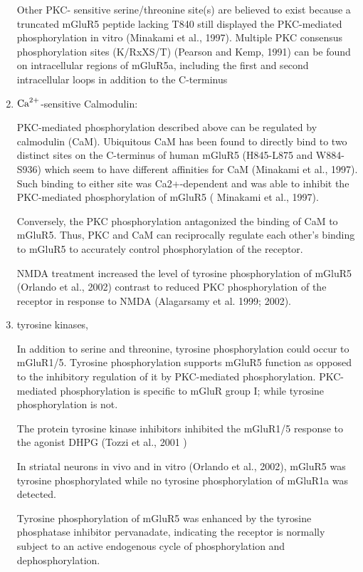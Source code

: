 \begin{enumerate}
Other PKC- sensitive serine/threonine site(s) are believed to exist
because a truncated mGluR5 peptide lacking T840 still displayed the PKC-mediated
phosphorylation in vitro (Minakami et al., 1997).
Multiple PKC consensus phosphorylation sites (K/RxXS/T) (Pearson and
Kemp, 1991) can be found on intracellular regions of mGluR5a, including the first and second
intracellular loops in addition to the C-terminus

  \item ${\text{Ca}^{2+}}$-sensitive Calmodulin:
  
PKC-mediated phosphorylation described above can be regulated by calmodulin
(CaM). Ubiquitous CaM has been found to directly bind to two distinct sites on
the C-terminus of human mGluR5 (H845-L875 and W884-S936) which seem to have
different affinities for CaM (Minakami et al., 1997).
Such binding to either site was Ca2+-dependent and was able to inhibit the
PKC-mediated phosphorylation of mGluR5 ( Minakami et al., 1997).

Conversely, the PKC phosphorylation antagonized the binding of CaM to
mGluR5. Thus, PKC and CaM can reciprocally regulate each other's binding to mGluR5 to
accurately control phosphorylation of the receptor.

NMDA treatment increased the level of tyrosine phosphorylation of mGluR5
(Orlando et al., 2002) contrast to reduced PKC phosphorylation of the receptor
in response to NMDA (Alagarsamy et al. 1999; 2002).

  \item tyrosine kinases,
  
In addition to serine and threonine, tyrosine phosphorylation could occur to
mGluR1/5. Tyrosine phosphorylation supports mGluR5 function as opposed to the
inhibitory regulation of it by PKC-mediated phosphorylation.
PKC-mediated phosphorylation is specific to mGluR group I; while tyrosine
phosphorylation is not.

The protein tyrosine kinase inhibitors inhibited the mGluR1/5 response to the
agonist DHPG (Tozzi et al., 2001 )

In striatal neurons in vivo and in vitro (Orlando et al., 2002), mGluR5 was
tyrosine phosphorylated while no tyrosine phosphorylation of mGluR1a was
detected.

Tyrosine phosphorylation of mGluR5 was enhanced by the tyrosine phosphatase
inhibitor pervanadate, indicating the receptor is normally subject to an active
endogenous cycle of phosphorylation and dephosphorylation.


\end{enumerate}
